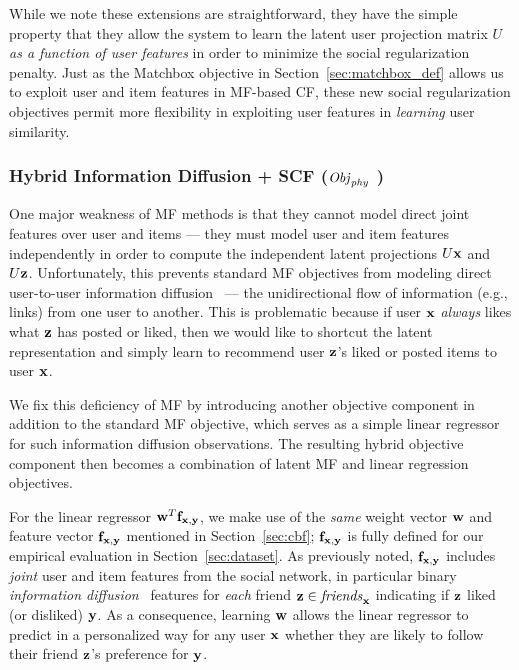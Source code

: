 While we note these extensions are straightforward, they have the
simple property that they allow the system to learn the latent user
projection matrix $U$ \emph{as a function of user features} in order
to minimize the social regularization penalty.  Just as the Matchbox
objective in Section~\ref{sec:matchbox_def} allows us to exploit user
and item features in MF-based CF, these new social regularization
objectives permit more flexibility in exploiting user features in
\emph{learning} user similarity.


\subsubsection{Hybrid Information Diffusion + SCF ($\mathit{Obj}_{\mathit{phy}}$ )}

\label{sec:hybrid_scf}

One major weakness of MF methods is that they cannot model direct
joint features over user and items --- they must model user and item
features independently in order to compute the independent latent
projections $U\mathbf{x}$ and $U\mathbf{z}$.  Unfortunately, this prevents standard MF
objectives from modeling direct user-to-user information
diffusion~\cite{inf_diffusion} --- the unidirectional flow of
information (e.g., links) from one user to another.  This is
problematic because if user $\mathbf{x}$ \emph{always} likes what $\mathbf{z}$ has
posted or liked, then we would like to shortcut the latent
representation and simply learn to recommend user $\mathbf{z}$'s liked or 
posted items to user $\mathbf{x}$.

We fix this deficiency of MF by introducing another objective component
in addition to the standard MF objective, which serves as
a simple linear regressor for such information diffusion
observations.  The resulting hybrid objective component then becomes a
combination of latent MF and linear regression objectives.

For the linear regressor $\mathbf{w}^T \mathbf{f}_{\mathbf{x},\mathbf{y}}$, we make use of the
\emph{same} weight vector $\mathbf{w}$ and feature vector $\mathbf{f}_{\mathbf{x},\mathbf{y}}$
mentioned in Section~\ref{sec:cbf}; $\mathbf{f}_{\mathbf{x},\mathbf{y}}$ is fully defined for
our empirical evaluation in Section~\ref{sec:dataset}.  As previously
noted, $\mathbf{f}_{\mathbf{x},\mathbf{y}}$ includes
\emph{joint} user and item features from the social network, in
particular binary
\emph{information diffusion}~\cite{inf_diffusion} features
for \emph{each} friend $\mathbf{z} \in \mathit{friends}_{\mathbf{x}}$ indicating if $\mathbf{z}$
liked (or disliked) $\mathbf{y}$.  As a consequence, learning $\mathbf{w}$ allows the
linear regressor to predict in a personalized way for any user $\mathbf{x}$
whether they are likely to follow their friend $\mathbf{z}$'s preference for $\mathbf{y}$.

